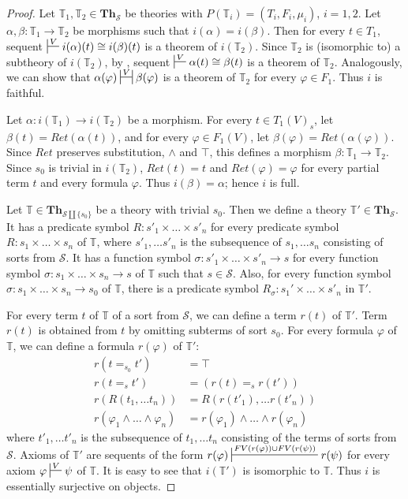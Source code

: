 \documentclass{elsarticle}
\theoremstyle{definition}
\theoremstyle{remark}
\newcommand{\cat}[1]{\mathbf{#1}}
\newcommand{\Th}{\cat{Th}}
\numberwithin{figure}{section}
\begin{document}
\begin{proof}
Let $\mathbb{T}_1,\mathbb{T}_2 \in \Th_\mathcal{S}$ be theories with $P(\mathbb{T}_i) = (T_i,F_i,\mu_i)$, $i = 1,2$.
Let $\alpha,\beta : \mathbb{T}_1 \to \mathbb{T}_2$ be morphisms such that $i(\alpha) = i(\beta)$.
Then for every $t \in T_1$, sequent $\sststile{}{V} i(\alpha)(t) \cong i(\beta)(t)$ is a theorem of $i(\mathbb{T}_2)$.
Since $\mathbb{T}_2$ is (isomorphic to) a subtheory of $i(\mathbb{T}_2)$, by , sequent $\sststile{}{V} \alpha(t) \cong \beta(t)$ is a theorem of $\mathbb{T}_2$.
Analogously, we can show that $\alpha(\varphi) \ssststile{}{V} \beta(\varphi)$ is a theorem of $\mathbb{T}_2$ for every $\varphi \in F_1$.
Thus $i$ is faithful.

Let $\alpha : i(\mathbb{T}_1) \to i(\mathbb{T}_2)$ be a morphism.
For every $t \in T_1(V)_s$, let $\beta(t) = Ret(\alpha(t))$, and for every $\varphi \in F_1(V)$, let $\beta(\varphi) = Ret(\alpha(\varphi))$.
Since $Ret$ preserves substitution, $\land$ and $\top$, this defines a morphism $\beta : \mathbb{T}_1 \to \mathbb{T}_2$.
Since $s_0$ is trivial in $i(\mathbb{T}_2)$, $Ret(t) = t$ and $Ret(\varphi) = \varphi$ for every partial term $t$ and every formula $\varphi$.
Thus $i(\beta) = \alpha$; hence $i$ is full.

Let $\mathbb{T} \in \Th_{\mathcal{S} \amalg \{ s_0 \}}$ be a theory with trivial $s_0$.
Then we define a theory $\mathbb{T}' \in \Th_\mathcal{S}$.
It has a predicate symbol $R : s'_1 \times \ldots \times s'_n$ for every predicate symbol $R : s_1 \times \ldots \times s_n$ of $\mathbb{T}$,
    where $s'_1, \ldots s'_n$ is the subsequence of $s_1, \ldots s_n$ consisting of sorts from $\mathcal{S}$.
It has a function symbol $\sigma : s'_1 \times \ldots \times s'_n \to s$ for every function symbol
    $\sigma : s_1 \times \ldots \times s_n \to s$ of $\mathbb{T}$ such that $s \in \mathcal{S}$.
Also, for every function symbol $\sigma : s_1 \times \ldots \times s_n \to s_0$ of $\mathbb{T}$,
    there is a predicate symbol $R_\sigma : s_1' \times \ldots \times s'_n$ in $\mathbb{T}'$.

For every term $t$ of $\mathbb{T}$ of a sort from $\mathcal{S}$, we can define a term $r(t)$ of $\mathbb{T}'$.
Term $r(t)$ is obtained from $t$ by omitting subterms of sort $s_0$.
For every formula $\varphi$ of $\mathbb{T}$, we can define a formula $r(\varphi)$ of $\mathbb{T}'$:
\begin{align*}
r(t =_{s_0} t') & = \top \\
r(t =_s t') & = (r(t) =_s r(t')) \\
r(R(t_1, \ldots t_n)) & = R(r(t'_1), \ldots r(t'_n)) \\
r(\varphi_1 \land \ldots \land \varphi_n) & = r(\varphi_1) \land \ldots \land r(\varphi_n)
\end{align*}
where $t'_1, \ldots t'_n$ is the subsequence of $t_1, \ldots t_n$ consisting of the terms of sorts from $\mathcal{S}$.
Axioms of $\mathbb{T}'$ are sequents of the form $r(\varphi) \sststile{}{FV(r(\varphi)) \cup FV(r(\psi))} r(\psi)$ for every axiom $\varphi \sststile{}{V} \psi$ of $\mathbb{T}$.
It is easy to see that $i(\mathbb{T}')$ is isomorphic to $\mathbb{T}$.
Thus $i$ is essentially surjective on objects.
\end{proof}
\end{document}
